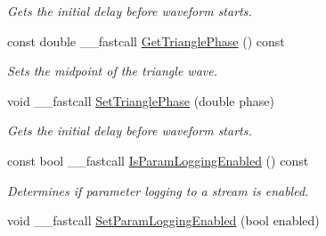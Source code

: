 \begin{DoxyCompactItemize}
\begin{DoxyCompactList}\small\item\em Gets the initial delay before waveform starts. \end{DoxyCompactList}\item 
\hypertarget{class_t_current_a1080e570003adc1e93ee8b75175ec312}{const double \+\_\+\+\_\+fastcall \hyperlink{class_t_current_a1080e570003adc1e93ee8b75175ec312}{Get\+Triangle\+Phase} () const }\label{class_t_current_a1080e570003adc1e93ee8b75175ec312}

\begin{DoxyCompactList}\small\item\em Sets the midpoint of the triangle wave. \end{DoxyCompactList}\item 
\hypertarget{class_t_current_a9fb121eff3c41cd1327ed46e4b83a4e8}{void \+\_\+\+\_\+fastcall \hyperlink{class_t_current_a9fb121eff3c41cd1327ed46e4b83a4e8}{Set\+Triangle\+Phase} (double phase)}\label{class_t_current_a9fb121eff3c41cd1327ed46e4b83a4e8}

\begin{DoxyCompactList}\small\item\em Gets the initial delay before waveform starts. \end{DoxyCompactList}\item 
\hypertarget{class_t_current_a4c4f8cb5f3f51c673296569476e63c4c}{const bool \+\_\+\+\_\+fastcall \hyperlink{class_t_current_a4c4f8cb5f3f51c673296569476e63c4c}{Is\+Param\+Logging\+Enabled} () const }\label{class_t_current_a4c4f8cb5f3f51c673296569476e63c4c}

\begin{DoxyCompactList}\small\item\em Determines if parameter logging to a stream is enabled. \end{DoxyCompactList}\item 
\hypertarget{class_t_current_a097338089fff277379b76021f1b2921e}{void \+\_\+\+\_\+fastcall \hyperlink{class_t_current_a097338089fff277379b76021f1b2921e}{Set\+Param\+Logging\+Enabled} (bool enabled)}\label{class_t_current_a097338089fff277379b76021f1b2921e}


\end{DoxyCompactItemize}
